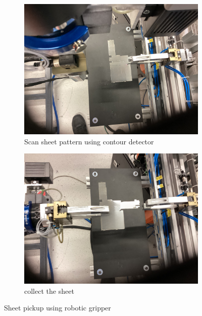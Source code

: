 
\begin{figure}[h]
    \centering
    \begin{subfigure}[b]{0.48\textwidth}
        \centering
        \includegraphics[width=\textwidth]{figures/sheet-pickup/scan.png}
        \caption{Scan sheet pattern using contour detector}
        \label{subfig:sheet-scan}
    \end{subfigure}\hspace{0.1cm}
    \begin{subfigure}[b]{0.48\textwidth}
        \centering
        \includegraphics[width=\textwidth]{figures/sheet-pickup/taken.png}
        \caption{collect the sheet}
        \label{subfig:sheet-taken}
    \end{subfigure}
    \caption{Sheet pickup using robotic gripper}
    \label{fig:sheet-pickup}
\end{figure}

